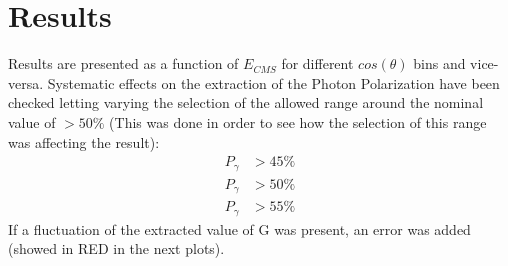 \section{Results}
Results are presented as a function of $E_{CMS}$ for different $cos(\theta)$ bins and vice-versa. Systematic effects on the extraction of the Photon Polarization have been checked letting varying the selection of the allowed range around the nominal value of $>50\%$ (This was done in order to see how the selection of this range was affecting the result):
\begin{align}
  P_\gamma &> 45 \% \\
  P_\gamma &> 50 \% \\
  P_\gamma &> 55 \% 
\end{align}
If a fluctuation of the extracted value of G was present, an error was added (showed in RED in the next plots).



